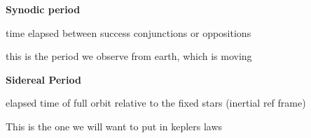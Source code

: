 \documentclass{article}
\begin{document}
\textbf{\large Synodic period }

\begin{list}{-}{}
\item time elapsed between success conjunctions or oppositions
\item this is the period we observe from earth, which is moving
\end{list}
\noindent
\textbf{\large Sidereal Period} 
\begin{list}{-}{}
\item elapsed time of full orbit relative to the fixed stars (inertial ref frame)
\item This is the one we will want to put in keplers laws
\end{list}
\end{document}
